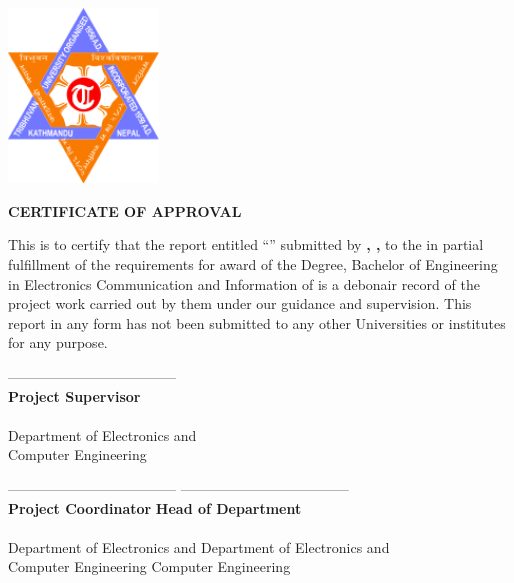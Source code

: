 \begin{titlepage}
	\clearpage
	\vfill
	\begin{center}
		\textbf{\MakeUppercase{\cUniversity}}\\
		\textbf{\MakeUppercase{\cDepartment} }\\
		\textbf{\MakeUppercase{\cCampus}} \\
		\vspace{4mm}
		\includegraphics[width=4cm]{images/logo.png}

		\vspace{4mm}
		\textbf{ \Large \uppercase{certificate of approval} }
		\vspace{4mm}

	\end{center}
	\noindent This is to certify that the report entitled “\textbf{\cTitle}” submitted by \textbf{\MakeUppercase{\cSubmittedI, \cSubmittedII,  \cSubmittedIII}} to the \cUniversity in partial fulfillment of the requirements for  award of the Degree, Bachelor of Engineering in Electronics Communication and Information of is a debonair record of the project work carried out by them under our guidance and supervision. This report in any form has not been submitted to any other Universities or institutes for any purpose.

	\vspace{9mm}
	\noindent------------------------------------ \\
	\noindent \textbf{Project Supervisor} \\
	\noindent \cSupervisor \\
	\noindent Department of Electronics and \\ Computer Engineering \\
	\noindent \cCampus

	\vspace{1cm}
	\noindent------------------------------------ \hfill ------------------------------------\\
	\noindent \textbf{Project Coordinator} \hfill \textbf{Head of Department}\\
	\noindent \cProjectCoordinator \hfill \cHOD\\
	\noindent Department of Electronics and \hfill Department of Electronics and \\ \noindent Computer Engineering \hfill Computer Engineering \\
	\noindent \cCampus \hfill \cCampus
\end{titlepage}

